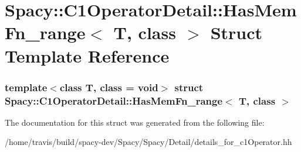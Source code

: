 \hypertarget{structSpacy_1_1C1OperatorDetail_1_1HasMemFn__range}{\section{\-Spacy\-:\-:\-C1\-Operator\-Detail\-:\-:\-Has\-Mem\-Fn\-\_\-range$<$ \-T, class $>$ \-Struct \-Template \-Reference}
\label{structSpacy_1_1C1OperatorDetail_1_1HasMemFn__range}
}
\subsubsection*{template$<$class T, class = void$>$ struct Spacy\-::\-C1\-Operator\-Detail\-::\-Has\-Mem\-Fn\-\_\-range$<$ T, class $>$}



\-The documentation for this struct was generated from the following file\-:\begin{DoxyCompactItemize}
\item 
/home/travis/build/spacy-\/dev/\-Spacy/\-Spacy/\-Detail/details\-\_\-for\-\_\-c1\-Operator.\-hh\end{DoxyCompactItemize}
